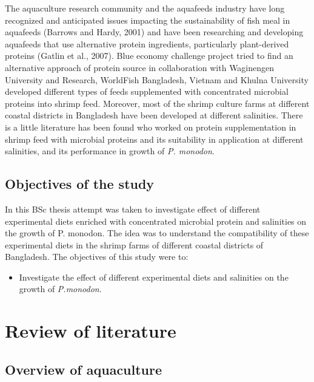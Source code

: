 \documentclass[
]{book}
\providecommand{\tightlist}{%
  \setlength{\itemsep}{0pt}\setlength{\parskip}{0pt}}
\begin{document}
The aquaculture research community and the aquafeeds industry have long recognized and
anticipated issues impacting the sustainability of fish meal in aquafeeds (Barrows and Hardy,
2001) and have been researching and developing aquafeeds that use alternative protein ingredients,
particularly plant-derived proteins (Gatlin et al., 2007). Blue economy challenge project tried to
find an alternative approach of protein source in collaboration with Waginengen University and
Research, WorldFish Bangladesh, Vietnam and Khulna University developed different types of
feeds supplemented with concentrated microbial proteins into shrimp feed. Moreover, most of the
shrimp culture farms at different coastal districts in Bangladesh have been developed at different
salinities. There is a little literature has been found who worked on protein supplementation in
shrimp feed with microbial proteins and its suitability in application at different salinities, and its
performance in growth of \emph{P. monodon}.

\hypertarget{objectives-of-the-study}{%
\section{Objectives of the study}\label{objectives-of-the-study}}

In this BSc thesis attempt was taken to investigate effect of different experimental diets enriched
with concentrated microbial protein and salinities on the growth of P. monodon. The idea was to
understand the compatibility of these experimental diets in the shrimp farms of different coastal
districts of Bangladesh.
The objectives of this study were to:

\begin{itemize}
\tightlist
\item
  Investigate the effect of different experimental diets and salinities on the growth of \emph{P.monodon}.
\end{itemize}

\hypertarget{review-of-literature}{%
\chapter{Review of literature}\label{review-of-literature}}

\hypertarget{overview-of-aquaculture}{%
\section{Overview of aquaculture}\label{overview-of-aquaculture}}
\end{document}
